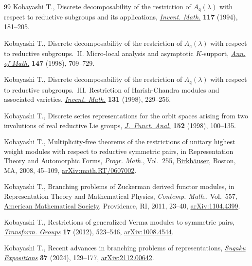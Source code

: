 \documentclass[pdftex]{sigma}
\numberwithin{equation}{section}
\theoremstyle{definition}
\begin{document}
\begin{thebibliography}{99}
Kobayashi T., Discrete decomposability of the restriction of
 {$A_{\mathfrak{q}}(\lambda)$} with respect to reductive subgroups and its
 applications, \href{https://doi.org/10.1007/BF01232239}{\textit{Invent.
 Math.}} \textbf{117} (1994), 181--205.

Kobayashi T., Discrete decomposability of the restriction of
 {$A_{\mathfrak{q}}(\lambda)$} with respect to reductive subgroups.~{II}.
 {M}icro-local analysis and asymptotic {$K$}-support,
 \href{https://doi.org/10.2307/120963}{\textit{Ann. of Math.}} \textbf{147}
 (1998), 709--729.

Kobayashi T., Discrete decomposability of the restriction of
 {$A_{\mathfrak{q}}(\lambda)$} with respect to reductive subgroups.~{III}.
 {R}estriction of {H}arish-{C}handra modules and associated varieties,
 \href{https://doi.org/10.1007/s002220050203}{\textit{Invent. Math.}}
 \textbf{131} (1998), 229--256.

Kobayashi T., Discrete series representations for the orbit spaces arising from
 two involutions of real reductive {L}ie groups,
 \href{https://doi.org/10.1006/jfan.1997.3128}{\textit{J.~Funct. Anal.}}
 \textbf{152} (1998), 100--135.

Kobayashi T., Multiplicity-free theorems of the restrictions of unitary highest
 weight modules with respect to reductive symmetric pairs, in Representation
 Theory and Automorphic Forms, \textit{Progr. Math.}, Vol.~255,
 \href{https://doi.org/10.1007/978-0-8176-4646-2_3}{Birkh\"auser},
 Boston, MA, 2008, 45--109,
 \href{http://arxiv.org/abs/math.RT/0607002}{arXiv:math.RT/0607002}.

Kobayashi T., Branching problems of {Z}uckerman derived functor modules, in
 Representation Theory and Mathematical Physics, \textit{Contemp. Math.}, Vol.~557, \href{https://doi.org/10.1090/conm/557/11024}{American Mathematical
 Society}, Providence, RI, 2011, 23--40,
 \href{http://arxiv.org/abs/1104.4399}{arXiv:1104.4399}.

Kobayashi T., Restrictions of generalized {V}erma modules to symmetric pairs,
 \href{https://doi.org/10.1007/s00031-012-9180-y}{\textit{Transform. Groups}}
 \textbf{17} (2012), 523--546,
 \href{http://arxiv.org/abs/1008.4544}{arXiv:1008.4544}.

Kobayashi T., Recent advances in branching problems of representations,
 \href{https://doi.org/10.1090/suga/485}{\textit{Sugaku Expositions}}
 \textbf{37} (2024), 129--177,
 \href{http://arxiv.org/abs/2112.00642}{arXiv:2112.00642}.


\end{thebibliography}
\end{document}
